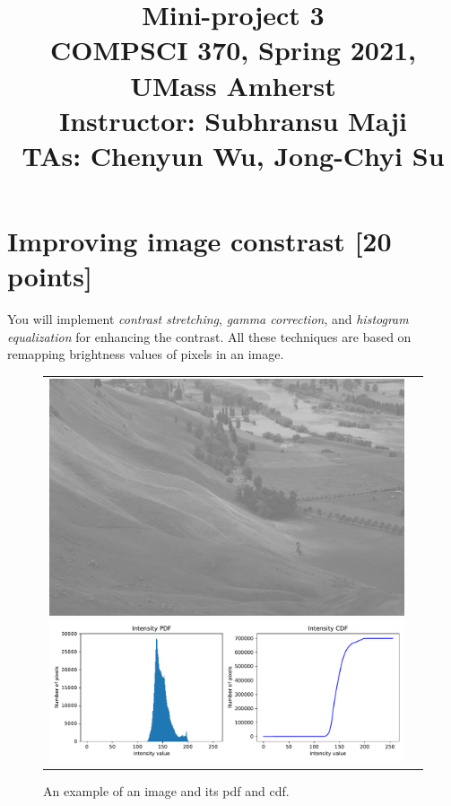 \documentclass[10pt,letterpaper]{article}
\title{
  Mini-project 3\\
  \Large{COMPSCI 370, Spring 2021, UMass Amherst} \\
  \Large{Instructor: Subhransu Maji} \\
  \Large{TAs: Chenyun Wu, Jong-Chyi Su}
}
\date{}
\begin{document}
\maketitle

\renewcommand\thesubsection{\thesection.\alph{subsection}}

\newpage


\section{Improving image constrast [20 points]}
You will implement \emph{contrast stretching}, \emph{gamma correction},
and \emph{histogram equalization} for enhancing the contrast.
All these techniques are based on remapping brightness values of
pixels in an image.

\begin{figure}[h]
\begin{tabular}{cc}
\includegraphics[width=0.33\linewidth,height=0.18\textheight]{fig/hills.jpg}
\includegraphics[width=0.66\linewidth,height=0.18\textheight]{fig/hills-hist.pdf} \\
\end{tabular}
\caption{\label{fig:original} An example of an image and its pdf and cdf.}
\end{figure}
\end{document}
